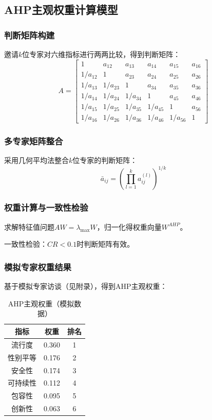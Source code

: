 \subsection{AHP主观权重计算模型}

\subsubsection{判断矩阵构建}

邀请$k$位专家对六维指标进行两两比较，得到判断矩阵：
\begin{equation}
A = \begin{bmatrix}
1 & a_{12} & a_{13} & a_{14} & a_{15} & a_{16} \\
1/a_{12} & 1 & a_{23} & a_{24} & a_{25} & a_{26} \\
1/a_{13} & 1/a_{23} & 1 & a_{34} & a_{35} & a_{36} \\
1/a_{14} & 1/a_{24} & 1/a_{34} & 1 & a_{45} & a_{46} \\
1/a_{15} & 1/a_{25} & 1/a_{35} & 1/a_{45} & 1 & a_{56} \\
1/a_{16} & 1/a_{26} & 1/a_{36} & 1/a_{46} & 1/a_{56} & 1
\end{bmatrix}
\label{eq:jm}
\end{equation}

\subsubsection{多专家矩阵整合}

采用几何平均法整合$k$位专家的判断矩阵：
\begin{equation}
\bar{a}_{ij} = \left( \prod_{l=1}^{k} a_{ij}^{(l)} \right)^{1/k}
\label{eq:geomean}
\end{equation}

\subsubsection{权重计算与一致性检验}

求解特征值问题$AW = \lambda_{\max} W$，归一化得权重向量$W^{AHP}$。

一致性检验：$CR < 0.1$时判断矩阵有效。

\subsubsection{模拟专家权重结果}

基于模拟专家访谈（见附录），得到AHP主观权重：
\begin{table}[htbp]
\centering
\caption{AHP主观权重（模拟数据）}
\label{tab:ahp_weights}
\begin{tabular}{ccc}
\toprule
指标 & 权重 & 排名 \\
\midrule
流行度 & 0.360 & 1 \\
性别平等 & 0.176 & 2 \\
安全性 & 0.174 & 3 \\
可持续性 & 0.112 & 4 \\
包容性 & 0.095 & 5 \\
创新性 & 0.063 & 6 \\
\bottomrule
\end{tabular}
\end{table}

